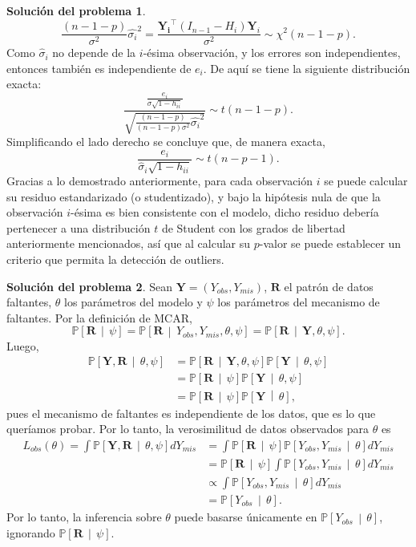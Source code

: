 \documentclass[twoside,12pt]{article}
\theoremstyle{definition}
\newtheorem{soln}{Solución del problema}
\newcommand{\probability}[1]{\mathbb{P}\left[#1\right]}
\newcommand{\given}{\,\middle|\,}
\begin{document}
\begin{soln}
\[
\frac{(n-1-p)}{\sigma^2}\hat{\sigma_i}^2= \frac{\mathbf{Y_i}^{\top}(I_{n-1}-H_i) \mathbf{Y}_i}{\sigma^2} \sim \chi^2(n-1-p).
\]
Como $\hat{\sigma}_i$ no depende de la $i$-ésima observación, y los errores son independientes, entonces también es independiente de $e_i$. De aquí se tiene la siguiente distribución exacta:
\[
\frac{\frac{e_i}{\sigma\sqrt{1-h_{ii}}}}{\sqrt{\frac{(n-1-p)}{(n-1-p)\sigma^2}\hat{\sigma_i}^2}} \sim t(n-1-p).
\]
Simplificando el lado derecho se concluye que, de manera exacta,
\[
\frac{e_i}{\hat{\sigma}_i \sqrt{1-h_{i i}}}\sim t(n-p-1).
\]
Gracias a lo demostrado anteriormente, para cada observación $i$ se puede calcular su residuo estandarizado (o studentizado), y bajo la hipótesis nula de que la observación $i$-ésima es bien consistente con el modelo, dicho residuo debería pertenecer a una distribución $t$ de Student con los grados de libertad anteriormente mencionados, así que al calcular su $p$-valor se puede establecer un criterio que permita la detección de outliers.
\end{soln}

\newpage
\begin{soln}
Sean $\boldsymbol{Y}=(Y_{obs},Y_{mis})$, $\boldsymbol{R}$ el patrón de datos faltantes, $\theta$ los parámetros del modelo y $\psi$ los parámetros del mecanismo de faltantes. Por la definición de MCAR,
\[
\probability{\boldsymbol{R}\given \psi} =\probability{\boldsymbol{R}\given Y_{obs},Y_{mis}, \theta, \psi}=\probability{\boldsymbol{R}\given \boldsymbol{Y}, \theta, \psi}.
\]
Luego,
\[
\begin{split}
    \probability{\boldsymbol{Y},\boldsymbol{R}\given \theta, \psi} &= 
    \probability{\boldsymbol{R}\given \boldsymbol{Y},\theta, \psi}\probability{\boldsymbol{Y}\given \theta, \psi} \\
    &= \probability{\boldsymbol{R}\given \psi}\probability{\boldsymbol{Y}\given \theta, \psi} \\
    &= \probability{\boldsymbol{R}\given \psi}\probability{\boldsymbol{Y}\given \theta},
\end{split}
\]
pues el mecanismo de faltantes es independiente de los datos, que es lo que queríamos probar. Por lo tanto, la verosimilitud de datos observados para $\theta$ es
\[
\begin{split}
  L_{obs}(\theta) = \int \probability{\boldsymbol{Y}, \boldsymbol{R} \given \theta, \psi} dY_{mis} &= \int \probability{\boldsymbol{R}\given \psi}\probability{Y_{obs}, Y_{mis}\given \theta} dY_{mis}\\
  &= \probability{\boldsymbol{R}\given \psi}\int \probability{Y_{obs}, Y_{mis}\given \theta} dY_{mis}\\
  & \propto \int \probability{Y_{obs}, Y_{mis}\given \theta} dY_{mis}\\
  &= \probability{Y_{obs} \given \theta}.
\end{split}
\]
Por lo tanto, la inferencia sobre $\theta$ puede basarse únicamente en $\probability{Y_{obs} \given \theta}$, ignorando $\probability{\boldsymbol{R}\given \psi}$. 
\end{soln}
\end{document}
